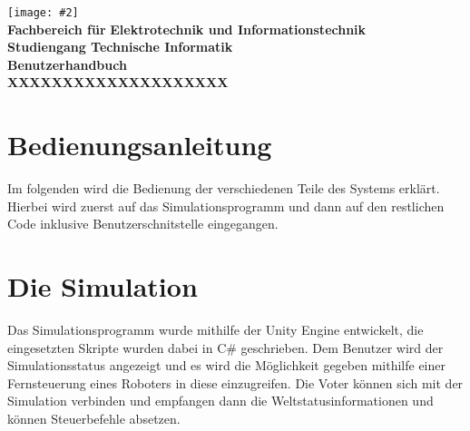 \documentclass[
    12pt,
    bibliography=totoc,
    ngerman,
    enabledeprecatedfontcommands
]{scrartcl}
\newcommand{\includevisio}[2][]{\texttt{[image: \#2]}}
\begin{document}

\thispagestyle{empty}
\begin{center}
	\includevisio{fhlogo}\\
	\large
	\textbf{Fachbereich f{\"{u}r}}
	\textbf{Elektrotechnik und Informationstechnik}\\
	\large
	\textbf{Studiengang Technische Informatik}\\
	\vspace*{3cm}
	\LARGE
	\textbf{Benutzerhandbuch}\\
	\Huge
	\vspace*{1cm}
	\textsf{\textbf{XXXXXXXXXXXXXXXXXXXX}}\\
	\vspace*{3cm}
	
	\vfill
	\normalsize
\end{center}
\pagebreak

\section{Bedienungsanleitung}
Im folgenden wird die Bedienung der verschiedenen Teile des Systems erkl{\"{a}}rt. Hierbei wird zuerst auf das Simulationsprogramm und dann auf
den restlichen Code inklusive Benutzerschnitstelle eingegangen.

\section{Die Simulation}
Das Simulationsprogramm wurde mithilfe der Unity Engine entwickelt, die eingesetzten Skripte wurden
dabei in C\# geschrieben. Dem Benutzer wird der Simulationsstatus angezeigt und es wird die M{\"{o}}glichkeit
gegeben mithilfe einer Fernsteuerung eines Roboters in diese einzugreifen. Die Voter k{\"{o}}nnen sich
mit der Simulation verbinden und empfangen dann die Weltstatusinformationen und k{\"{o}}nnen Steuerbefehle
absetzen.
\end{document}
